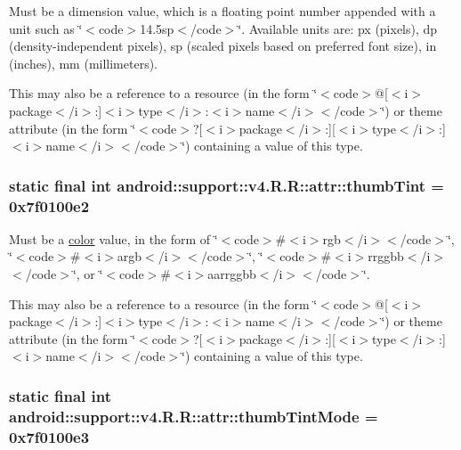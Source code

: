 Must be a dimension value, which is a floating point number appended with a unit such as \char`\"{}$<$code$>$14.5sp$<$/code$>$\char`\"{}. Available units are: px (pixels), dp (density-independent pixels), sp (scaled pixels based on preferred font size), in (inches), mm (millimeters). 

This may also be a reference to a resource (in the form \char`\"{}$<$code$>$@\mbox{[}$<$i$>$package$<$/i$>$:\mbox{]}$<$i$>$type$<$/i$>$:$<$i$>$name$<$/i$>$$<$/code$>$\char`\"{}) or theme attribute (in the form \char`\"{}$<$code$>$?\mbox{[}$<$i$>$package$<$/i$>$:\mbox{]}\mbox{[}$<$i$>$type$<$/i$>$:\mbox{]}$<$i$>$name$<$/i$>$$<$/code$>$\char`\"{}) containing a value of this type. \hypertarget{classandroid_1_1support_1_1v4_1_1_r_1_1attr_6e21e127a0682bf5dbc3849767500a8f}{
\subsubsection[{thumbTint}]{\setlength{\rightskip}{0pt plus 5cm}static final int android::support::v4.R.R::attr::thumbTint = 0x7f0100e2}}
\label{classandroid_1_1support_1_1v4_1_1_r_1_1attr_6e21e127a0682bf5dbc3849767500a8f}


Must be a \hyperlink{classandroid_1_1support_1_1v4_1_1_r_1_1color}{color} value, in the form of \char`\"{}$<$code$>$\#$<$i$>$rgb$<$/i$>$$<$/code$>$\char`\"{}, \char`\"{}$<$code$>$\#$<$i$>$argb$<$/i$>$$<$/code$>$\char`\"{}, \char`\"{}$<$code$>$\#$<$i$>$rrggbb$<$/i$>$$<$/code$>$\char`\"{}, or \char`\"{}$<$code$>$\#$<$i$>$aarrggbb$<$/i$>$$<$/code$>$\char`\"{}. 

This may also be a reference to a resource (in the form \char`\"{}$<$code$>$@\mbox{[}$<$i$>$package$<$/i$>$:\mbox{]}$<$i$>$type$<$/i$>$:$<$i$>$name$<$/i$>$$<$/code$>$\char`\"{}) or theme attribute (in the form \char`\"{}$<$code$>$?\mbox{[}$<$i$>$package$<$/i$>$:\mbox{]}\mbox{[}$<$i$>$type$<$/i$>$:\mbox{]}$<$i$>$name$<$/i$>$$<$/code$>$\char`\"{}) containing a value of this type. \hypertarget{classandroid_1_1support_1_1v4_1_1_r_1_1attr_3040d16b189e4e4e63eb0ef4f8809f66}{
\subsubsection[{thumbTintMode}]{\setlength{\rightskip}{0pt plus 5cm}static final int android::support::v4.R.R::attr::thumbTintMode = 0x7f0100e3}}
\label{classandroid_1_1support_1_1v4_1_1_r_1_1attr_3040d16b189e4e4e63eb0ef4f8809f66}


